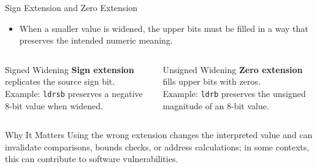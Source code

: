 \documentclass[aspectratio=169,11pt,t]{beamer}
\newcommand{\key}[1]{\textbf{#1}}
\newcommand{\code}[1]{\texttt{#1}}
\begin{document}

\begin{frame}{Sign Extension and Zero Extension}

\begin{itemize}\setlength{\itemsep}{4pt}
  \item When a smaller value is widened, the upper bits must be filled in a way that preserves the intended numeric meaning.
\end{itemize}

\vfill

\begin{columns}[T,onlytextwidth]


\begin{block}{Signed Widening}
\key{Sign extension} replicates the source sign bit.\\
Example: \code{ldrsb} preserves a negative 8-bit value when widened.
\end{block}


\begin{block}{Unsigned Widening}
\key{Zero extension} fills upper bits with zeros.\\
Example: \code{ldrb} preserves the unsigned magnitude of an 8-bit value.
\end{block}

\end{columns}

\vfill

\begin{block}{Why It Matters}
Using the wrong extension changes the interpreted value and can invalidate comparisons, bounds checks, or address calculations; in some contexts, this can contribute to software vulnerabilities.
\end{block}

\end{frame}








\end{document}
